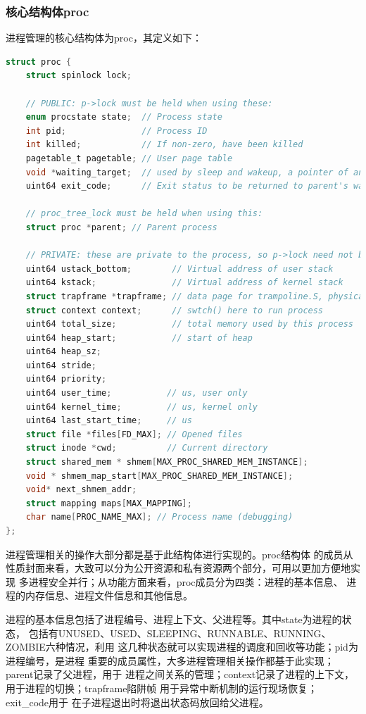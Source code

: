 \documentclass[UTF8,a4paper,10pt]{ctexart}
\begin{document}
\subsubsection{核心结构体proc}

进程管理的核心结构体为proc，其定义如下：

\begin{lstlisting}[title=proc结构体,frame=trbl,language={C}]
  struct proc {
    struct spinlock lock;

    // PUBLIC: p->lock must be held when using these:
    enum procstate state;  // Process state
    int pid;               // Process ID
    int killed;            // If non-zero, have been killed
    pagetable_t pagetable; // User page table
    void *waiting_target;  // used by sleep and wakeup, a pointer of anything
    uint64 exit_code;      // Exit status to be returned to parent's wait

    // proc_tree_lock must be held when using this:
    struct proc *parent; // Parent process

    // PRIVATE: these are private to the process, so p->lock need not be held.
    uint64 ustack_bottom;        // Virtual address of user stack
    uint64 kstack;               // Virtual address of kernel stack
    struct trapframe *trapframe; // data page for trampoline.S, physical address
    struct context context;      // swtch() here to run process
    uint64 total_size;           // total memory used by this process
    uint64 heap_start;           // start of heap
    uint64 heap_sz;
    uint64 stride;
    uint64 priority;
    uint64 user_time;           // us, user only
    uint64 kernel_time;         // us, kernel only
    uint64 last_start_time;     // us
    struct file *files[FD_MAX]; // Opened files
    struct inode *cwd;          // Current directory
    struct shared_mem * shmem[MAX_PROC_SHARED_MEM_INSTANCE];
    void * shmem_map_start[MAX_PROC_SHARED_MEM_INSTANCE];
    void* next_shmem_addr;
    struct mapping maps[MAX_MAPPING];
    char name[PROC_NAME_MAX]; // Process name (debugging)
};
  \end{lstlisting}

进程管理相关的操作大部分都是基于此结构体进行实现的。proc结构体
的成员从性质封面来看，大致可以分为公开资源和私有资源两个部分，可用以更加方便地实现
多进程安全并行；从功能方面来看，proc成员分为四类：进程的基本信息、
进程的内存信息、进程文件信息和其他信息。

进程的基本信息包括了进程编号、进程上下文、父进程等。其中state为进程的状态，
包括有UNUSED、USED、SLEEPING、RUNNABLE、RUNNING、ZOMBIE六种情况，利用
这几种状态就可以实现进程的调度和回收等功能；pid为进程编号，是进程
重要的成员属性，大多进程管理相关操作都基于此实现；parent记录了父进程，用于
进程之间关系的管理；context记录了进程的上下文，用于进程的切换；trapframe陷阱帧
用于异常中断机制的运行现场恢复；exit\_code用于
在子进程退出时将退出状态码放回给父进程。
\end{document}
